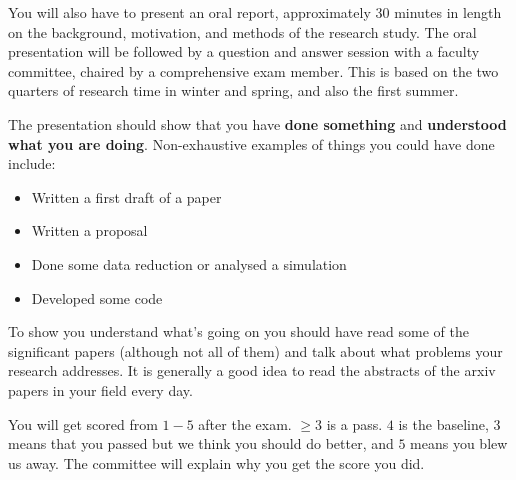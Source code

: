 \documentclass[12pt]{article}
\begin{document}
You will also have to present an oral report, approximately 30 minutes in length on the background, motivation, and methods of the research study. The oral presentation will be followed by a question and answer session with a faculty committee, chaired by a comprehensive exam member. This is based on the two quarters of research time in winter and spring, and also the first summer.

The presentation should show that you have \textbf{done something} and \textbf{understood what you are doing}. Non-exhaustive examples of things you could have done include:
\begin{itemize}
  \item Written a first draft of a paper
  \item Written a proposal
  \item Done some data reduction or analysed a simulation
  \item Developed some code
\end{itemize}

To show you understand what's going on you should have read some of the significant papers (although not all of them) and talk about what problems your research addresses. It is generally a good idea to read the abstracts of the arxiv papers in your field every day.

You will get scored from $1-5$ after the exam. $\geq 3$ is a pass. $4$ is the baseline, $3$ means that you passed but we think you should do better, and $5$ means you blew us away. The committee will explain why you get the score you did.
\end{document}
